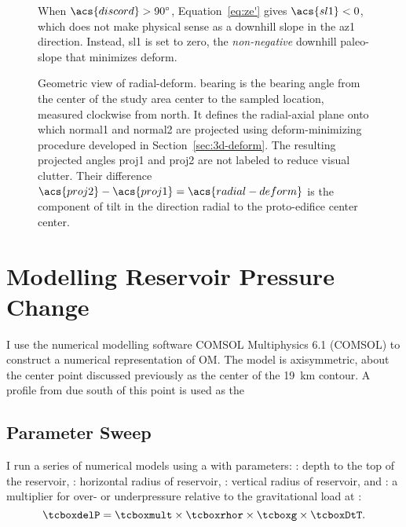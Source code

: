\begin{figure}
    {\caption[Reversal case: $\acs{discord}>\ang{90}$]{When $\acs{discord}>\ang{90}$, Equation~\eqref{eq:ze'} gives $\acs{sl1}<0$, which does not make physical sense as a downhill slope in the \acs{az1} direction. Instead, \acs{sl1} is set to zero, the \emph{non-negative} downhill paleo-slope that minimizes \acs{deform}.}\label{fig:reversal}}
    {\hspace*{-0.4\linewidth}}
    \vspace*{-9em}
    {\caption[Calculation of \acf{radial-deform} from mapping]{Geometric view of \acl{radial-deform}. \acs{bearing} is the bearing angle from the center of the study area \acs{center} to the sampled location, measured clockwise from \acf{north}. It defines the radial-axial plane onto which \acs{normal1} and \acs{normal2} are projected using \acs{deform}-minimizing procedure developed in Section~\ref{sec:3d-deform}. The resulting projected angles \acs{proj1} and \acs{proj2} are not labeled to reduce visual clutter. Their difference $\acs{proj2}-\acs{proj1}=\acs{radial-deform}$ is the component of tilt in the direction radial to the proto-edifice center \acs{center}.}\label{fig:radial}}
    {}
\end{figure}

\section{Modelling Reservoir Pressure Change}

I use the numerical modelling software COMSOL Multiphysics 6.1 (COMSOL) to construct a numerical representation of \acf{OM}. The model is axisymmetric, about the center point discussed previously as the center of the \qty{19}{\km} contour. A profile from due south of this point is used as the 

\subsection{Parameter Sweep}

I run a series of numerical models using a  with parameters: : depth to the top of the reservoir, : horizontal radius of reservoir, : vertical radius of reservoir, and : a multiplier for over- or underpressure relative to the gravitational load at :
\begin{equation}
    \hltt{delP}=\hltt{mult}\times\hltt{rhor}\times\hltt{g}\times\hltt{DtT}.
\end{equation}

